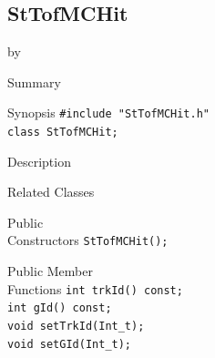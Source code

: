\documentclass[twoside]{article}
\newcommand{\entrylabel}[1]{\mbox{\textbf{{#1}}}\hfil}%
\newenvironment{entry}
{\begin{list}{}%
    {\renewcommand{\makelabel}{\entrylabel}%
     \setlength{\labelwidth}{90pt}%
     \setlength{\leftmargin}{\labelwidth}
     \advance\leftmargin by \labelsep%
      }%
    }%
  {\end{list}}
\newcommand{\Entrylabel}[1]%
{\raisebox{0pt}[1ex][0pt]{\makebox[\labelwidth][l]%
    {\parbox[t]{\labelwidth}{\hspace{0pt}\textbf{{#1}}}}}}
\newenvironment{Entry}%
{\renewcommand{\entrylabel}{\Entrylabel}\begin{entry}}%
  {\end{entry}}
\begin{document}
\subsection{StTofMCHit}
\label{sec:StTofMCHit}
\begin{Entry}
\item[Summary]
\item[Synopsis]
    \verb+#include "StTofMCHit.h"+\\
    \verb+class StTofMCHit;+\\
\item[Description]
\item[Related Classes]
\item[Public\\ Constructors]
    \verb+StTofMCHit();+\\
\item[Public Member\\ Functions]
    \verb+int trkId() const;+\\
    \verb+int gId() const;+\\
    \verb+void setTrkId(Int_t);+\\
    \verb+void setGId(Int_t);+\\
\end{Entry}
\clearpage
\end{document}
